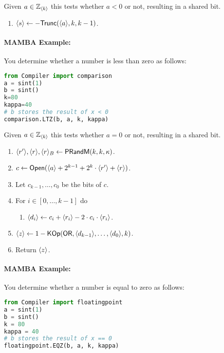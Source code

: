 Given $a \in {\mathbb{Z}}_{\langle k \rangle}$ this tests whether $a<0$ or not,
resulting in a shared bit.
\begin{enumerate}
\item $\langle s \rangle \leftarrow - \mathsf{Trunc}(\langle a \rangle,k,k-1)$.
\end{enumerate}

\paragraph{MAMBA Example:} You determine whether a number is less than zero as follows: 
\begin{lstlisting}[language={python}]
from Compiler import comparison
a = sint(1)
b = sint()
k=80
kappa=40
# b stores the result of x < 0
comparison.LTZ(b, a, k, kappa)
\end{lstlisting}

Given $a \in {\mathbb{Z}}_{\langle k \rangle}$ this tests whether $a=0$ or not,
resulting in a shared bit.
\begin{enumerate}
\item $\langle r' \rangle, \langle r \rangle, \langle r \rangle_B \leftarrow \mathsf{PRandM}(k,k,\kappa)$.
\item $c \leftarrow {\mathsf{Open}}(\langle a \rangle+2^{k-1}+2^k \cdot \langle r' \rangle+\langle r \rangle)$.
\item Let $c_{k-1},\ldots,c_0$ be the bits of $c$.
\item For $i \in [0,\ldots,k-1]$ do
\begin{enumerate}
   \item $\langle d_i \rangle \leftarrow c_i+\langle r_i \rangle-2 \cdot c_i \cdot \langle r_i \rangle$.
\end{enumerate}
\item $\langle z \rangle \leftarrow 1- \mathsf{KOp}(\mathsf{OR},\langle d_{k-1} \rangle,\ldots,\langle d_0 \rangle,k)$.
\item Return $\langle z \rangle$.
\end{enumerate}

\paragraph{MAMBA Example:} You determine whether a number is equal to zero as follows: 
\begin{lstlisting}[language={python}]
from Compiler import floatingpoint
a = sint(1)
b = sint()
k = 80
kappa = 40
# b stores the result of x == 0
floatingpoint.EQZ(b, a, k, kappa)
\end{lstlisting}


